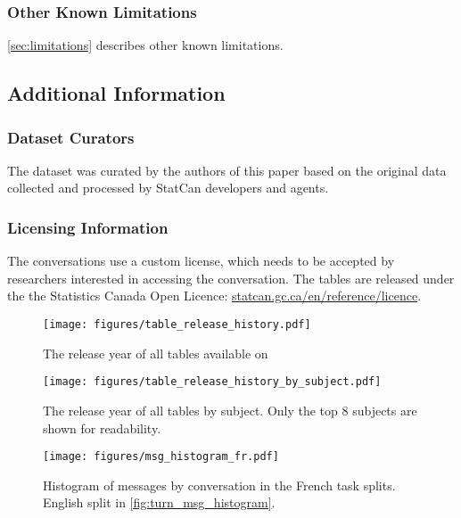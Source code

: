 \documentclass[11pt]{article}
\begin{document}
\subsubsection{Other Known Limitations}

\autoref{sec:limitations} describes other known limitations.

\subsection{ Additional Information }

\subsubsection{ Dataset Curators }

The dataset was curated by the authors of this paper based on the original data collected and processed by StatCan developers and agents.

\subsubsection{Licensing Information }

The conversations use a custom license, which needs to be accepted by researchers interested in accessing the conversation. The tables are released under the the Statistics Canada Open Licence: \href{https://www.statcan.gc.ca/en/reference/licence}{statcan.gc.ca/en/reference/licence}.



\begin{figure*}[h]
    \small
    \centering
    \texttt{[image: figures/table\_release\_history.pdf]}
    \caption{The release year of all tables available on }
    \label{fig:table_release_history}
\end{figure*}

\begin{figure*}[h]
    \small
    \centering
    \texttt{[image: figures/table\_release\_history\_by\_subject.pdf]}
    \caption{The release year of all tables by subject. Only the top 8 subjects are shown for readability.}
    \label{fig:table_release_history_by_subject}
\end{figure*}


\begin{figure*}[h]
    \small
    \centering
    \texttt{[image: figures/msg\_histogram\_fr.pdf]}
    \caption{Histogram of messages by conversation in the French task splits. English split in \autoref{fig:turn_msg_histogram}.}
    \label{fig:turn_msg_histogram_fr}
\end{figure*}
\end{document}
